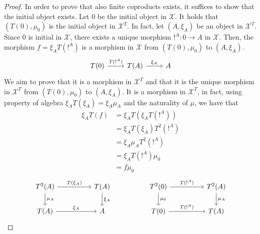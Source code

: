 \begin{subbox}{}
\begin{proof}
        In order to prove that also finite coproducts exists, it suffices to show that the initial object exists. Let $0$ be the initial object in $\mathcal{X}$. It holds that $(T(0),\mu_0)$ is the initial object in $\mathcal{X}^T$. In fact, let $(A,\xi_A)$ be an object in $\mathcal{X}^T$. Since $0$ is initial in $\mathcal{X}$, there exists a unique morphism $!^A:0 \to A$ in $\mathcal{X}$. Then, the morphism $f=\xi_A T(!^A)$ is a morphism in $\mathcal{X}$ from $(T(0),\mu_0)$ to $(A,\xi_A)$.
        \[
\begin{tikzcd}
T(0) \arrow[r, "T(!^A)"] & T(A) \arrow[r, "\xi_A"] & A
\end{tikzcd}
        \]
        We aim to prove that it is a morphism in $\mathcal{X}^T$ and that it is the unique morphism in $\mathcal{X}^T$ from $(T(0),\mu_0)$ to $(A,\xi_A)$.
        It is a morphism in $\mathcal{X}^T$, in fact, using property of algebra $\xi_A T(\xi_A) = \xi_A \mu_A$ and the naturality of $\mu$, we have that
        \begin{align*}
            \xi_A T(f) & = \xi_A T(\xi_A T(!^A)) \\[1.5ex]
            & = \xi_A T(\xi_A) T^2(!^A) \\[1.5ex]
            & = \xi_A \mu_A T^2(!^A) \\[1.5ex]
            & = \xi_A T(!^A) \mu_{0} \\[1.5ex]
            & = f \mu_0
        \end{align*}
        \[
\begin{tikzcd}
T^2(A) \arrow[d, "\mu_A"] \arrow[rr, "T(\xi_A)"] &  & T(A) \arrow[d, "\xi_A"] &  & T^2(0) \arrow[rr, "T(!^A)"] \arrow[d, "\mu_0"] &  & T^2(A) \arrow[d, "\mu_A"] \\
T(A) \arrow[rr, "\xi_A"]                         &  & A                       &  & T(0) \arrow[rr, "T(!^A)"]                      &  & T(A)                     
\end{tikzcd}
\]
\end{proof}
\end{subbox}
